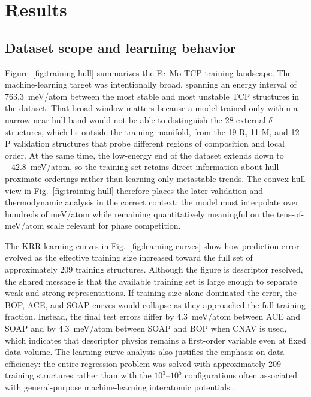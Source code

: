 \documentclass[prb,twocolumn,floatfix]{revtex4-2}
\begin{document}
\section{Results}

\subsection{Dataset scope and learning behavior}

Figure~\ref{fig:training-hull} summarizes the Fe--Mo TCP training landscape. The machine-learning target was intentionally broad, spanning an energy interval of 763.3~meV/atom between the most stable and most unstable TCP structures in the dataset. That broad window matters because a model trained only within a narrow near-hull band would not be able to distinguish the 28 external $\delta$ structures, which lie outside the training manifold, from the 19 R, 11 M, and 12 P validation structures that probe different regions of composition and local order. At the same time, the low-energy end of the dataset extends down to $-42.8$~meV/atom, so the training set retains direct information about hull-proximate orderings rather than learning only metastable trends. The convex-hull view in Fig.~\ref{fig:training-hull} therefore places the later validation and thermodynamic analysis in the correct context: the model must interpolate over hundreds of meV/atom while remaining quantitatively meaningful on the tens-of-meV/atom scale relevant for phase competition.

The KRR learning curves in Fig.~\ref{fig:learning-curves} show how prediction error evolved as the effective training size increased toward the full set of approximately 209 training structures. Although the figure is descriptor resolved, the shared message is that the available training set is large enough to separate weak and strong representations. If training size alone dominated the error, the BOP, ACE, and SOAP curves would collapse as they approached the full training fraction. Instead, the final test errors differ by 4.3~meV/atom between ACE and SOAP and by 4.3~meV/atom between SOAP and BOP when CNAV is used, which indicates that descriptor physics remains a first-order variable even at fixed data volume. The learning-curve analysis also justifies the emphasis on data efficiency: the entire regression problem was solved with approximately 209 training structures rather than with the $10^3$--$10^5$ configurations often associated with general-purpose machine-learning interatomic potentials \cite{Bartok2010GAP,BehlerParrinello2007,Batzner2022NequIP,ChenOng2022M3GNet,Zuo2020}.
\end{document}
